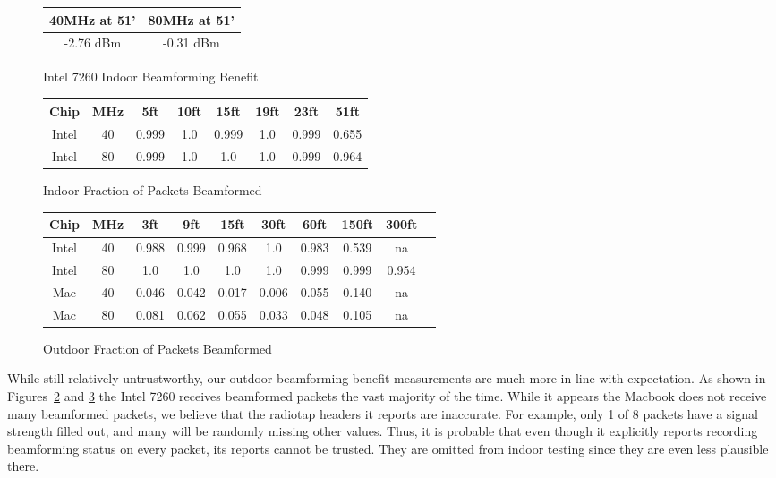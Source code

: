\begin{figure}[h!]
\centering
\begin{tabular}{| c | c |}
\hline
40MHz at 51' & 80MHz at 51'\\ \hline
-2.76 dBm &  -0.31 dBm\\ \hline
\end{tabular}
\caption{Intel 7260 Indoor Beamforming Benefit}
\label{fig:intelindoorbeamresult}
\end{figure}

\begin{figure}[b!]
\centering
\begin{tabular}{| c | c || c | c | c | c | c | c |}
\hline
Chip & MHz & 5ft & 10ft & 15ft & 19ft & 23ft & 51ft\\ \hline
Intel & 40 & 0.999 & 1.0 & 0.999 & 1.0 & 0.999 & 0.655\\ \hline
Intel & 80 & 0.999 & 1.0 & 1.0 & 1.0 & 0.999 & 0.964\\ \hline
\end{tabular}
\caption{Indoor Fraction of Packets Beamformed}
\label{fig:indoorbeampercent}
\end{figure}


\begin{figure}[b!]
\centering
\begin{tabular}{| c | c || c | c | c | c | c | c | c | c |}
\hline
Chip & MHz & 3ft & 9ft & 15ft & 30ft & 60ft & 150ft & 300ft\\ \hline
Intel & 40 & 0.988 & 0.999 & 0.968 & 1.0 & 0.983 & 0.539 & na\\ \hline
Intel & 80 & 1.0 & 1.0 & 1.0 & 1.0 & 0.999 & 0.999 & 0.954\\ \hline
Mac & 40 & 0.046 & 0.042 & 0.017 & 0.006 & 0.055 & 0.140 & na\\ \hline
Mac & 80 & 0.081 & 0.062 & 0.055 & 0.033 & 0.048 & 0.105 & na\\ \hline
\end{tabular}
\caption{Outdoor Fraction of Packets Beamformed}
\label{fig:outdoorbeampercent}
\end{figure}


While still relatively untrustworthy, our outdoor beamforming benefit
measurements are much more in line with expectation. As shown in
Figures~\ref{fig:indoorbeampercent} and \ref{fig:outdoorbeampercent}
the Intel 7260 receives beamformed packets the vast majority of the
time. While it appears the Macbook does not receive many beamformed
packets, we believe that the radiotap headers it reports are
inaccurate. For example, only 1 of 8 packets have a signal strength
filled out, and many will be randomly missing other values. Thus, it
is probable that even though it explicitly reports recording
beamforming status on every packet, its reports cannot be
trusted. They are omitted from indoor testing since they are even less
plausible there.
